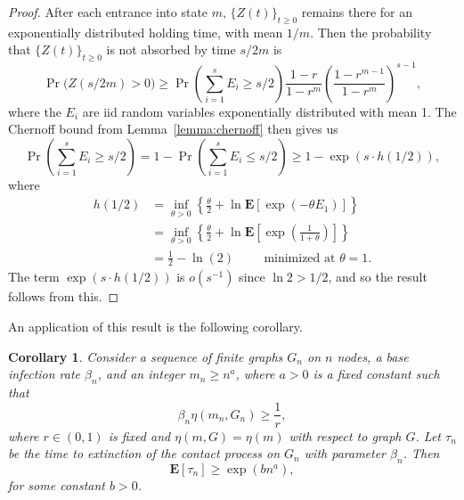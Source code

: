 \documentclass[11pt]{article}
\newtheorem{corollary}{Corollary}[theorem]
\begin{document}
\begin{proof}
After each entrance into state $m$, $\{Z(t)\}_{t\geq 0}$ remains there for an exponentially distributed holding time, with mean $1/m$. Then the probability that $\{Z(t)\}_{t\geq 0}$ is not absorbed by time $s/2m$ is
$$\Pr\Big( Z(s/2m) > 0 \Big) \geq \Pr \left( \sum_{i=1}^s E_i \geq s/2 \right) \frac{1-r}{1-r^m} \left(\frac{1-r^{m-1}}{1-r^m}\right)^{s-1},$$
where the $E_i$ are iid random variables exponentially distributed with mean 1. The Chernoff bound from Lemma~\ref{lemma:chernoff} then gives us
$$\Pr\left(\sum_{i=1}^s E_i \geq s/2\right) = 1 - \Pr\left(\sum_{i=1}^s E_i \leq s/2\right) \geq 1 - \exp(s\cdot h(1/2)),$$
where
$$\begin{aligned}
h(1/2) &= \inf_{\theta >0} \left\{ \frac{\theta}{2} + \ln \mathbf{E}[\exp(-\theta E_1)]\right\} \\
	&= \inf_{\theta >0} \left\{ \frac{\theta}{2} + \ln \mathbf{E}\left[\exp\left(\frac{1}{1+\theta}\right)\right]\right\} \\
	&= \frac{1}{2} - \ln(2) \hspace{1cm} \text{minimized at } \theta=1.
\end{aligned}$$
The term $\exp(s\cdot h(1/2))$ is $o(s^{-1})$ since $\ln 2 > 1/2$, and so the result follows from this.
\end{proof}

An application of this result is the following corollary.

\begin{corollary}
Consider a sequence of finite graphs $G_n$ on $n$ nodes, a base infection rate $\beta_n$, and an integer $m_n \geq n^a$, where $a>0$ is a fixed constant such that
$$\beta_n \eta(m_n,G_n) \geq \frac{1}{r},$$
where $r\in (0,1)$ is fixed and $\eta(m,G)=\eta(m)$ with respect to graph $G$. Let $\tau_n$ be the time to extinction of the contact process on $G_n$ with parameter $\beta_n$. Then
$$\mathbf{E}[\tau_n] \geq \exp\left( bn^a\right),$$
for some constant $b>0$.
\end{corollary}
\end{document}
